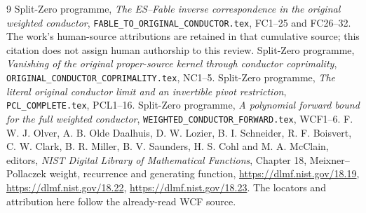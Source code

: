 \documentclass[11pt]{article}
\begin{document}
\begin{thebibliography}{9}
 Split-Zero programme, \emph{The ES--Fable inverse
correspondence in the original weighted conductor},
\texttt{FABLE\_TO\_ORIGINAL\_CONDUCTOR.tex}, FC1--25 and FC26--32.
The work's human-source attributions are retained in that cumulative
source; this citation does not assign human authorship to this review.
 Split-Zero programme, \emph{Vanishing of the original
proper-source kernel through conductor coprimality},
\texttt{ORIGINAL\_CONDUCTOR\_COPRIMALITY.tex}, NC1--5.
 Split-Zero programme, \emph{The literal original
conductor limit and an invertible pivot restriction},
\texttt{PCL\_COMPLETE.tex}, PCL1--16.
 Split-Zero programme, \emph{A polynomial forward bound
for the full weighted conductor},
\texttt{WEIGHTED\_CONDUCTOR\_FORWARD.tex}, WCF1--6.
 F. W. J. Olver, A. B. Olde Daalhuis, D. W. Lozier,
B. I. Schneider, R. F. Boisvert, C. W. Clark, B. R. Miller,
B. V. Saunders, H. S. Cohl and M. A. McClain, editors,
\emph{NIST Digital Library of Mathematical Functions}, Chapter 18,
Meixner--Pollaczek weight, recurrence and generating function,
\url{https://dlmf.nist.gov/18.19},
\url{https://dlmf.nist.gov/18.22},
\url{https://dlmf.nist.gov/18.23}.
The locators and attribution here follow the already-read WCF source.
\end{thebibliography}
\end{document}
